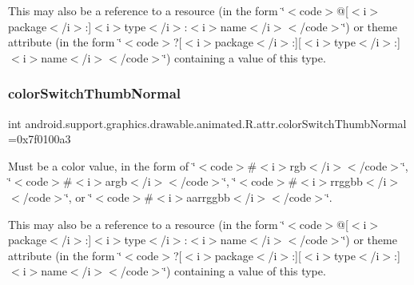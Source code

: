 This may also be a reference to a resource (in the form \char`\"{}$<$code$>$@\mbox{[}$<$i$>$package$<$/i$>$\+:\mbox{]}$<$i$>$type$<$/i$>$\+:$<$i$>$name$<$/i$>$$<$/code$>$\char`\"{}) or theme attribute (in the form \char`\"{}$<$code$>$?\mbox{[}$<$i$>$package$<$/i$>$\+:\mbox{]}\mbox{[}$<$i$>$type$<$/i$>$\+:\mbox{]}$<$i$>$name$<$/i$>$$<$/code$>$\char`\"{}) containing a value of this type. \mbox{\label{classandroid_1_1support_1_1graphics_1_1drawable_1_1animated_1_1R_1_1attr_a639d6e9ccda64b68ee8abce8ec30bf63}} 
\subsubsection{\texorpdfstring{color\+Switch\+Thumb\+Normal}{colorSwitchThumbNormal}}
{\footnotesize\ttfamily int android.\+support.\+graphics.\+drawable.\+animated.\+R.\+attr.\+color\+Switch\+Thumb\+Normal =0x7f0100a3\hspace{0.3cm}{\ttfamily [static]}}

Must be a color value, in the form of \char`\"{}$<$code$>$\#$<$i$>$rgb$<$/i$>$$<$/code$>$\char`\"{}, \char`\"{}$<$code$>$\#$<$i$>$argb$<$/i$>$$<$/code$>$\char`\"{}, \char`\"{}$<$code$>$\#$<$i$>$rrggbb$<$/i$>$$<$/code$>$\char`\"{}, or \char`\"{}$<$code$>$\#$<$i$>$aarrggbb$<$/i$>$$<$/code$>$\char`\"{}. 

This may also be a reference to a resource (in the form \char`\"{}$<$code$>$@\mbox{[}$<$i$>$package$<$/i$>$\+:\mbox{]}$<$i$>$type$<$/i$>$\+:$<$i$>$name$<$/i$>$$<$/code$>$\char`\"{}) or theme attribute (in the form \char`\"{}$<$code$>$?\mbox{[}$<$i$>$package$<$/i$>$\+:\mbox{]}\mbox{[}$<$i$>$type$<$/i$>$\+:\mbox{]}$<$i$>$name$<$/i$>$$<$/code$>$\char`\"{}) containing a value of this type. \mbox{\label{classandroid_1_1support_1_1graphics_1_1drawable_1_1animated_1_1R_1_1attr_a60b45e5a3dc7d323c7379580b72cdfa7}} 
